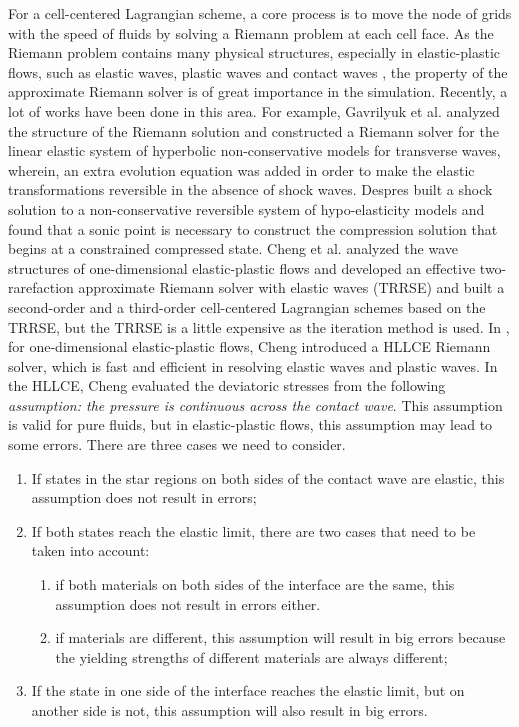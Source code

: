 \documentclass[review]{elsarticle}
\begin{document}
For a cell-centered Lagrangian scheme, a core process is to move the node of grids with the speed of fluids
 by solving a Riemann problem at each cell face. As the Riemann problem contains many physical structures, especially in elastic-plastic flows, such as elastic waves, plastic waves and contact waves
  , the property of the approximate Riemann solver is of great importance in the simulation. Recently, a lot of works have been done in
  this area. For example, Gavrilyuk et al. \cite{gavrilyuk2008modelling} analyzed the structure of the Riemann solution and constructed a Riemann solver for the linear elastic system  of hyperbolic non-conservative models for transverse waves, wherein, an extra evolution equation was added in order to make the elastic transformations reversible in the absence of shock waves. Despres \cite{despres2007geometrical} built a shock solution to a non-conservative reversible system of hypo-elasticity models and found that a sonic point is necessary to construct  the compression solution that begins at a constrained compressed state.  Cheng et al.  \cite{cheng2015high} analyzed the wave structures of one-dimensional elastic-plastic flows and developed an effective two-rarefaction approximate Riemann solver with elastic waves (TRRSE) and built a  second-order and  a third-order cell-centered Lagrangian schemes based on the TRRSE, but the TRRSE is a little  expensive as  the iteration method is used.
In \cite{cheng2016harten}, for one-dimensional elastic-plastic flows, Cheng introduced a HLLCE Riemann solver, which is fast and efficient in resolving elastic waves and plastic waves. In the HLLCE,  Cheng evaluated the deviatoric stresses from the following \emph{assumption: the  pressure is continuous across the contact wave}. This assumption is valid for pure fluids, but  in  elastic-plastic flows, this assumption may lead to some errors. There are three cases we need  to consider.
\begin{enumerate}
  \item If states in the star regions on both sides of the contact wave are elastic, this assumption does not result in errors;
  \item If both states reach the elastic limit, there are two cases that  need to be taken into account:
  \begin{enumerate}
    \item if both  materials on both sides of the interface are the  same, this assumption does not result in errors either.
    \item if  materials are different, this assumption will result in big errors because the yielding strengths of different materials are always different;
  \end{enumerate}
  \item If the  state in one side of the interface reaches the elastic limit, but on another side  is  not,  this assumption will  also result in big errors.
\end{enumerate}
\end{document}

